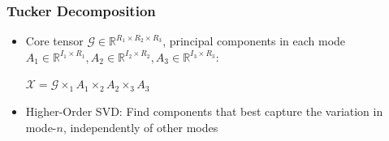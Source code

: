 \documentclass{beamer}
\begin{document}
\begin{frame}
\frametitle{Tucker Decomposition}
\begin{itemize}
\item Core tensor $\mathcal{G}\in \mathbb{R}^{R_1\times R_2\times R_3}$, principal components in each mode $A_1\in \mathbb{R}^{I_1\times R_1},A_2\in \mathbb{R}^{I_2\times R_2}, A_3\in \mathbb{R}^{I_3\times R_3}$:\\ \begin{center} $ \mathcal{X} =  \mathcal{G} \times_1 A_1\times_2 A_2 \times_3 A_3$\end{center}
\item Higher-Order SVD: Find components that best capture the variation in mode-$n$, independently of other modes%
\end{itemize}
\end{frame}
\end{document}
